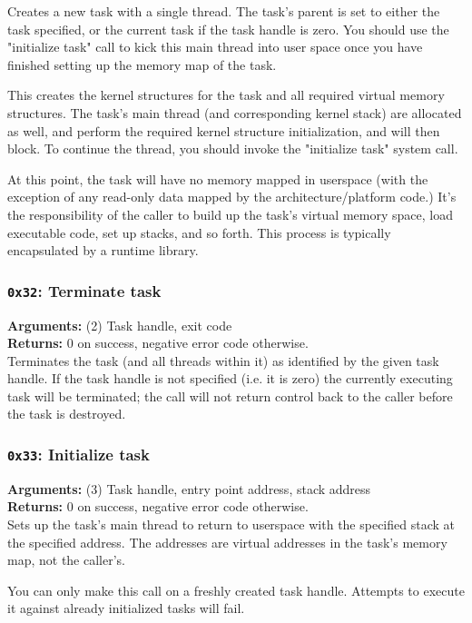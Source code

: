 \documentclass[11pt]{article}
\begin{document}
Creates a new task with a single thread. The task's parent is set to either the task specified, or the current task if the task handle is zero. You should use the "initialize task" call to kick this main thread into user space once you have finished setting up the memory map of the task.

This creates the kernel structures for the task and all required virtual memory structures. The task's main thread (and corresponding kernel stack) are allocated as well, and perform the required kernel structure initialization, and will then block. To continue the thread, you should invoke the "initialize task" system call.

At this point, the task will have no memory mapped in userspace (with the exception of any read-only data mapped by the architecture/platform code.) It's the responsibility of the caller to build up the task's virtual memory space, load executable code, set up stacks, and so forth. This process is typically encapsulated by a runtime library.

\subsubsection{{\tt 0x32}: Terminate task}
\textbf{Arguments:} (2) Task handle, exit code \\
\textbf{Returns:} 0 on success, negative error code otherwise. \\

Terminates the task (and all threads within it) as identified by the given task handle. If the task handle is not specified (i.e. it is zero) the currently executing task will be terminated; the call will not return control back to the caller before the task is destroyed.

\subsubsection{{\tt 0x33}: Initialize task}
\textbf{Arguments:} (3) Task handle, entry point address, stack address \\
\textbf{Returns:} 0 on success, negative error code otherwise. \\

Sets up the task's main thread to return to userspace with the specified stack at the specified address. The addresses are virtual addresses in the task's memory map, not the caller's.

You can only make this call on a freshly created task handle. Attempts to execute it against already initialized tasks will fail.
\end{document}
